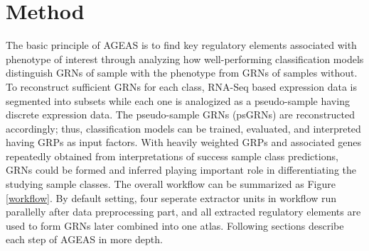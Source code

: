 \documentclass[fleqn,10pt]{wlscirep}
\begin{document}
\section*{Method}
  \label{method}
  The basic principle of AGEAS is to find key regulatory elements associated with phenotype of interest through analyzing how well-performing classification models distinguish GRNs of sample with the phenotype from GRNs of samples without.
  To reconstruct sufficient GRNs for each class, RNA-Seq based expression data is segmented into subsets while each one is analogized as a pseudo-sample having discrete expression data.
  The pseudo-sample GRNs (psGRNs) are reconstructed accordingly; thus, classification models can be trained, evaluated, and interpreted having GRPs as input factors.
  With heavily weighted GRPs and associated genes repeatedly obtained from interpretations of success sample class predictions, GRNs could be formed and inferred playing important role in differentiating the studying sample classes.
  The overall workflow can be summarized as Figure \ref{workflow}.
  By default setting, four seperate extractor units in workflow run parallelly after data preprocessing part, and all extracted regulatory elements are used to form GRNs later combined into one atlas.
  Following sections describe each step of AGEAS in more depth.
\end{document}

